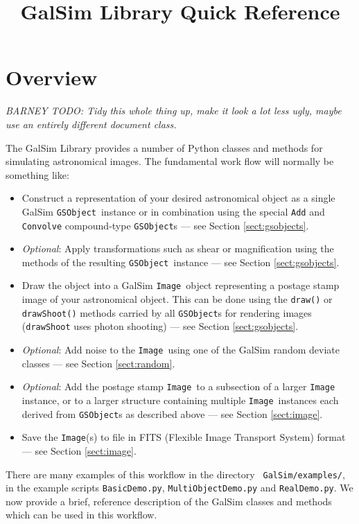\documentclass[preprint,10pt]{aastex}
\newcommand{\gsobject}{{\tt GSObject}}
\newcommand{\image}{{\tt Image}}
\begin{document}
\title{GalSim Library Quick Reference}

\section{Overview}

\emph{BARNEY TODO: Tidy this whole thing up, make it look a lot less ugly,
maybe use an entirely different document class.}

The GalSim Library provides a number of Python classes and methods for
simulating astronomical images.  The fundamental work flow will
normally be something like:
\begin{itemize}

\item Construct a representation of your desired astronomical object
  as a single GalSim \gsobject~instance or in combination using the special {\tt Add} and
  {\tt Convolve} compound-type \gsobject s --- see Section \ref{sect:gsobjects}.
\item \emph{Optional}: Apply transformations such as shear or magnification using
  the methods of the resulting \gsobject~instance --- see Section \ref{sect:gsobjects}.
\item Draw the object into a GalSim \image~object representing a
  postage stamp image of your astronomical object.  This can be done
  using the {\tt draw()} or {\tt drawShoot()} methods carried by all
  \gsobject s for rendering images ({\tt drawShoot} uses photon
  shooting) --- see Section \ref{sect:gsobjects}.
\item \emph{Optional}: Add noise to the \image~using one of the GalSim random
  deviate classes --- see Section \ref{sect:random}.
\item \emph{Optional}: Add the postage stamp \image~to a subsection of
  a larger \image~ instance, or to a larger
  structure containing multiple \image~instances each derived from \gsobject s
  as described above --- see Section \ref{sect:image}.
\item Save the \image (s) to file in FITS (Flexible Image Transport
  System) format --- see Section \ref{sect:image}.
\end{itemize}

There are many examples of this workflow in the directory {\tt
  GalSim/examples/}, in the example scripts {\tt BasicDemo.py},
{\tt MultiObjectDemo.py} and {\tt RealDemo.py}.  We now provide a
brief, reference description of the GalSim classes and methods which
can be used in this workflow.
\end{document}

